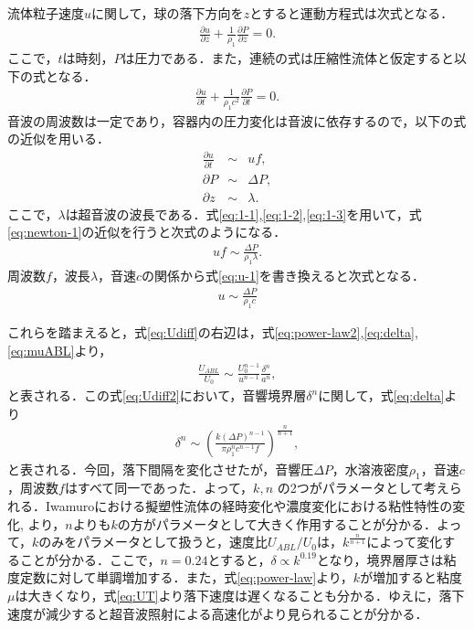 流体粒子速度$u$に関して，球の落下方向を$z$とすると運動方程式は次式となる．
\begin{eqnarray}
    \frac{\partial u}{\partial z} + \frac{1}{\rho_1}\frac{\partial P}{\partial z} = 0 .
    \label{eq:newton-1}
\end{eqnarray}
ここで，$t$は時刻，$P$は圧力である．また，連続の式は圧縮性流体と仮定すると以下の式となる．
\begin{eqnarray}
    \frac{\partial u}{\partial t} + \frac{1}{\rho_1 c^2}\frac{\partial P}{\partial t} = 0 .
\end{eqnarray}
音波の周波数は一定であり，容器内の圧力変化は音波に依存するので，以下の式の近似を用いる．
\begin{eqnarray}
    \frac{\partial u}{\partial t} &\sim& uf ,\label{eq:1-1}\\
    \partial P &\sim& \Delta P ,\label{eq:1-2}\\
    \partial z &\sim& \lambda .\label{eq:1-3}
\end{eqnarray}
ここで，$\lambda$は超音波の波長である．式\ref{eq:1-1},\ref{eq:1-2},\ref{eq:1-3}を用いて，式\ref{eq:newton-1}の近似を行うと次式のようになる．
\begin{eqnarray}
    uf \sim \frac{\Delta P}{\rho_1 \lambda} .
    \label{eq:u-1}
\end{eqnarray}
周波数$f$，波長$\lambda$，音速$c$の関係から式\ref{eq:u-1}を書き換えると次式となる．
\begin{eqnarray}
    u \sim \frac{\Delta P}{\rho_1 c}
\end{eqnarray}

これらを踏まえると，式\ref{eq:Udiff}の右辺は，式\ref{eq:power-law2},\ref{eq:delta},\ref{eq:muABL}より，
\begin{eqnarray}
    \frac{U_{ABL}}{U_0} \sim \frac{U_0^{n-1}}{u^{n-1}}\frac{\delta^n}{a^n} ,
    \label{eq:Udiff2}
\end{eqnarray}
と表される．この式\ref{eq:Udiff2}において，音響境界層$\delta^n$に関して，式\ref{eq:delta}より
\begin{eqnarray}
    \delta^n \sim \left(\frac{k\left(\Delta P\right)^{n-1}}{\pi \rho^n_1 c^{n-1} f}\right)^{\frac{n}{n+1}} ,
    \label{eq:ndelta}
\end{eqnarray}
と表される．今回，落下間隔を変化させたが，音響圧$\Delta P$，水溶液密度$\rho_1$，音速$c$，周波数$f$はすべて同一であった．よって，$k,n$ の2つがパラメータとして考えられる．Iwamuro\cite{ref:9}における擬塑性流体の経時変化や濃度変化における粘性特性の変化\cite{ref:Rahimi2007},\cite{ref:Agi2018} より，$n$よりも$k$の方がパラメータとして大きく作用することが分かる．よって，$k$のみをパラメータとして扱うと，速度比$U_{ABL}/U_0$は，$k^\frac{n}{n+1}$によって変化することが分かる．ここで，$n=0.24$とすると，$\delta \propto k^{0.19}$となり，境界層厚さは粘度定数に対して単調増加する．また，式\ref{eq:power-law}より，$k$が増加すると粘度$\mu$は大きくなり，式\ref{eq:UT}より落下速度は遅くなることも分かる．ゆえに，落下速度が減少すると超音波照射による高速化がより見られることが分かる．

